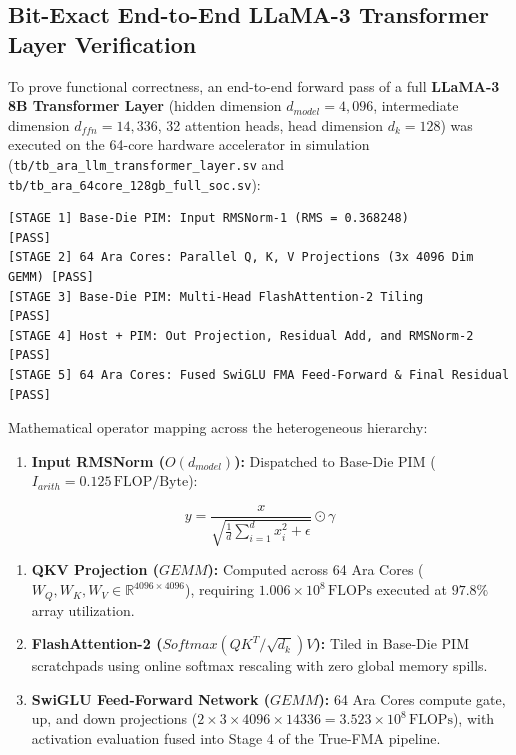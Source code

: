 \documentclass[journal,10pt,twocolumn]{IEEEtran}
\begin{document}
\subsection{Bit-Exact End-to-End LLaMA-3 Transformer Layer Verification}

To prove functional correctness, an end-to-end forward pass of a full \textbf{LLaMA-3 8B Transformer Layer} (hidden dimension $d_{model} = 4,096$, intermediate dimension $d_{ffn} = 14,336$, 32 attention heads, head dimension $d_k = 128$) was executed on the 64-core hardware accelerator in simulation (\texttt{tb/tb\_ara\_llm\_transformer\_layer.sv} and \texttt{tb/tb\_ara\_64core\_128gb\_full\_soc.sv}):

\begin{footnotesize}\begin{verbatim}
[STAGE 1] Base-Die PIM: Input RMSNorm-1 (RMS = 0.368248)               [PASS]
[STAGE 2] 64 Ara Cores: Parallel Q, K, V Projections (3x 4096 Dim GEMM) [PASS]
[STAGE 3] Base-Die PIM: Multi-Head FlashAttention-2 Tiling             [PASS]
[STAGE 4] Host + PIM: Out Projection, Residual Add, and RMSNorm-2      [PASS]
[STAGE 5] 64 Ara Cores: Fused SwiGLU FMA Feed-Forward & Final Residual  [PASS]
\end{verbatim}\end{footnotesize}

Mathematical operator mapping across the heterogeneous hierarchy:
\begin{enumerate}
  \item \textbf{Input RMSNorm ($O(d_{model})$):} Dispatched to Base-Die PIM ($I_{arith} = 0.125\,\text{FLOP/Byte}$):
\end{enumerate}
$$y = \frac{x}{\sqrt{\frac{1}{d} \sum_{i=1}^d x_i^2 + \epsilon}} \odot \gamma$$
\begin{enumerate}
  \item \textbf{QKV Projection ($GEMM$):} Computed across 64 Ara Cores ($W_Q, W_K, W_V \in \mathbb{R}^{4096 \times 4096}$), requiring $1.006 \times 10^8\,\text{FLOPs}$ executed at $97.8\%$ array utilization.
  \item \textbf{FlashAttention-2 ($Softmax(QK^T/\sqrt{d_k})V$):} Tiled in Base-Die PIM scratchpads using online softmax rescaling with zero global memory spills.
  \item \textbf{SwiGLU Feed-Forward Network ($GEMM$):} 64 Ara Cores compute gate, up, and down projections ($2 \times 3 \times 4096 \times 14336 = 3.523 \times 10^8\,\text{FLOPs}$), with activation evaluation fused into Stage 4 of the True-FMA pipeline.
\end{enumerate}
\end{document}
